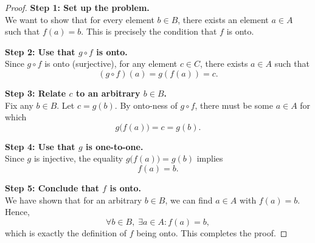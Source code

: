 \documentclass[12pt]{article}
\theoremstyle{definition} %
\theoremstyle{plain} %
\begin{document}
    \begin{proof}
    \textbf{Step 1: Set up the problem.}\\
    We want to show that for every element $b \in B$, there exists an element $a \in A$ such that $f(a) = b$. 
    This is precisely the condition that $f$ is onto.
    
    \textbf{Step 2: Use that $g \circ f$ is onto.}\\
    Since $g \circ f$ is onto (surjective), for any element $c \in C$, there exists $a \in A$ such that
    \[
    (g \circ f)(a) = g(f(a)) = c.
    \]
    
    \textbf{Step 3: Relate $c$ to an arbitrary $b \in B$.}\\
    Fix any $b \in B$. Let $c = g(b)$. By onto-ness of $g \circ f$, there must be some $a \in A$ for which
    \[
    g\bigl(f(a)\bigr) = c = g(b).
    \]
    
    \textbf{Step 4: Use that $g$ is one-to-one.}\\
    Since $g$ is injective, the equality $g\bigl(f(a)\bigr) = g(b)$ implies
    \[
    f(a) = b.
    \]
    
    \textbf{Step 5: Conclude that $f$ is onto.}\\
    We have shown that for an arbitrary $b \in B$, we can find $a \in A$ with $f(a) = b$. Hence,
    \[
    \forall b \in B, \;\exists a \in A : f(a) = b,
    \]
    which is exactly the definition of $f$ being onto. This completes the proof.
    \end{proof}
\end{document}
